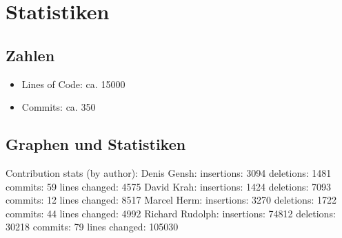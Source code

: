 \chapter{Statistiken}

    \section{Zahlen}
        \begin{itemize}
            \item Lines of Code: ca. 15000
            \item Commits: ca. 350
        \end{itemize}
        
    \section{Graphen und Statistiken}
    Contribution stats (by author):\newline
\newline
	Denis Gensh:\newline
	  insertions:    3094\newline
	  deletions:     1481\newline
	  commits:       59\newline
	  lines changed: 4575\newline
\newline
	David Krah:\newline
	  insertions:    1424\newline
	  deletions:     7093\newline
	  commits:       12\newline
	  lines changed: 8517\newline
\newline
	Marcel Herm:\newline
	  insertions:    3270\newline
	  deletions:     1722\newline
	  commits:       44\newline
	  lines changed: 4992\newline
\newline
	Richard Rudolph:\newline
	  insertions:    74812\newline
	  deletions:     30218\newline
	  commits:       79\newline
	  lines changed: 105030\newline
\newline
